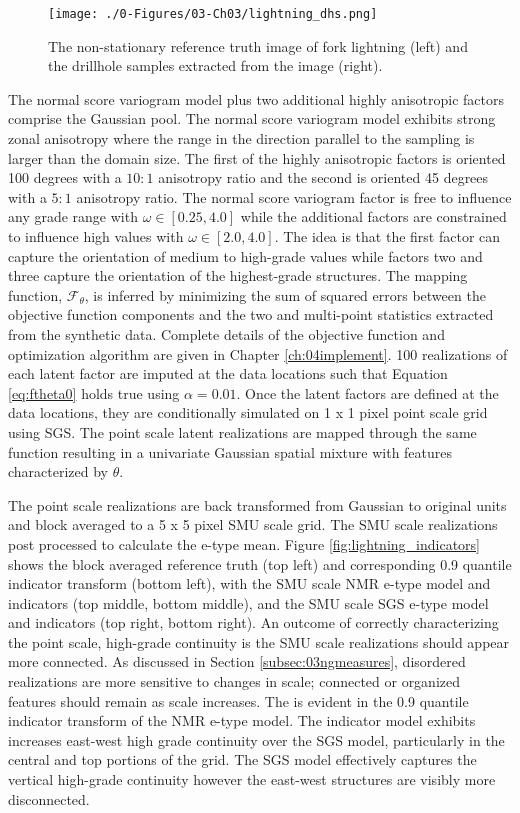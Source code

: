 \begin{figure}[htb!]
    \centering
    \texttt{[image: ./0-Figures/03-Ch03/lightning\_dhs.png]}
    \caption{The non-stationary reference truth image of fork lightning (left) and the drillhole samples extracted from the image (right). }
    \label{fig:lightning_dhs}
\end{figure}

The normal score variogram model plus two additional highly anisotropic factors comprise the Gaussian pool. The normal score variogram model exhibits strong zonal anisotropy where the range in the direction parallel to the sampling is larger than the domain size. The first of the highly anisotropic factors is oriented 100 degrees with a $10:1$ anisotropy ratio and the second is oriented 45 degrees with a  $5:1$ anisotropy ratio. The normal score variogram factor is free to influence any grade range with $\omega \in [0.25, 4.0]$ while the additional factors are constrained to influence high values with $\omega \in [2.0, 4.0]$. The idea is that the first factor can capture the orientation of medium to high-grade values while factors two and three capture the orientation of the highest-grade structures. The mapping function, $\mathcal{F}_{\theta}$, is inferred by minimizing the sum of squared errors between the objective function components and the two and multi-point statistics extracted from the synthetic data. Complete details of the objective function and optimization algorithm are given in Chapter \ref{ch:04implement}. 100 realizations of each latent factor are imputed at the data locations such that Equation \ref{eq:ftheta0} holds true using $\alpha = 0.01$. Once the latent factors are defined at the data locations, they are conditionally simulated on 1 x 1 pixel point scale grid using \gls{SGS}. The point scale latent realizations are mapped through the same function resulting in a univariate Gaussian spatial mixture with features characterized by $\theta$.

The point scale realizations are back transformed from Gaussian to original units and block averaged to a 5 x 5 pixel \gls{SMU} scale grid. The \gls{SMU} scale realizations post processed to calculate the e-type mean. Figure \ref{fig:lightning_indicators} shows the block averaged reference truth (top left) and corresponding 0.9 quantile indicator transform (bottom left), with the \gls{SMU} scale \gls{NMR} e-type model and indicators (top middle, bottom middle), and the \gls{SMU} scale \gls{SGS} e-type model and indicators (top right, bottom right). An outcome of correctly characterizing the point scale, high-grade continuity is the \gls{SMU} scale realizations should appear more connected. As discussed in Section \ref{subsec:03ngmeasures}, disordered realizations are more sensitive to changes in scale; connected or organized features should remain as scale increases. The is evident in the 0.9 quantile indicator transform of the \gls{NMR} e-type model. The indicator model exhibits increases east-west high grade continuity over the \gls{SGS} model, particularly in the central and top portions of the grid. The \gls{SGS} model effectively captures the vertical high-grade continuity however the east-west structures are visibly more disconnected.


